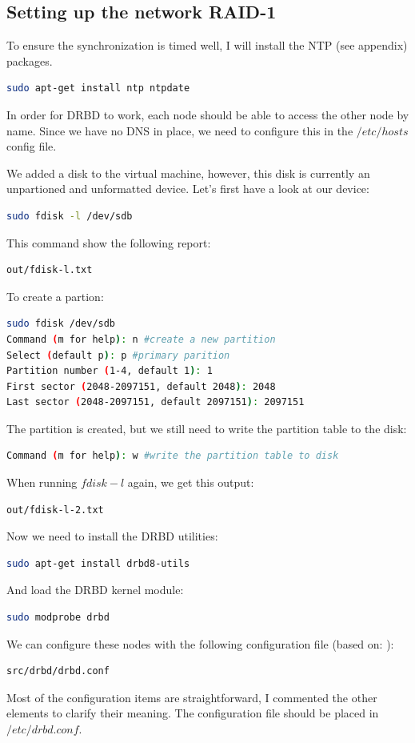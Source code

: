 \documentclass[12pt]{report}
\begin{document}
\subsection{Setting up the network RAID-1}
To ensure the synchronization is timed well, I will install the NTP
(see appendix) packages.
\begin{lstlisting}[language=bash]
sudo apt-get install ntp ntpdate
\end{lstlisting}

In order for DRBD to work, each node should be able to access the
other node by name. Since we have no DNS in place, we need to
configure this in the $/etc/hosts$ config file.

We added a disk to the virtual machine, however, this disk is
currently an unpartioned and unformatted device.
Let's first have a look at our device:
\begin{lstlisting}[language=bash]
sudo fdisk -l /dev/sdb
\end{lstlisting}
This command show the following report:
\begin{lstlisting}[language=bash]
out/fdisk-l.txt
\end{lstlisting}
To create a partion:
\begin{lstlisting}[language=bash]
sudo fdisk /dev/sdb
Command (m for help): n #create a new partition
Select (default p): p #primary parition
Partition number (1-4, default 1): 1
First sector (2048-2097151, default 2048): 2048
Last sector (2048-2097151, default 2097151): 2097151
\end{lstlisting}
The partition is created, but we still need to write the partition
table to the disk:
\begin{lstlisting}[language=bash]
Command (m for help): w #write the partition table to disk
\end{lstlisting}
When running $fdisk -l$ again, we get this output:
\begin{lstlisting}[language=bash]
out/fdisk-l-2.txt
\end{lstlisting}

Now we need to install the DRBD utilities:
\begin{lstlisting}[language=bash]
sudo apt-get install drbd8-utils
\end{lstlisting}
And load the DRBD kernel module:
\begin{lstlisting}[language=bash]
sudo modprobe drbd
\end{lstlisting}

We can configure these nodes with the following configuration file
(based on: \cite{drbd_ubuntu_doc} \cite{drbd_official_doc}):
\begin{lstlisting}[language=bash]
src/drbd/drbd.conf
\end{lstlisting}
Most of the configuration items are straightforward, I commented the
other elements to clarify their meaning.
The configuration file should be placed in $/etc/drbd.conf$.
\end{document}
